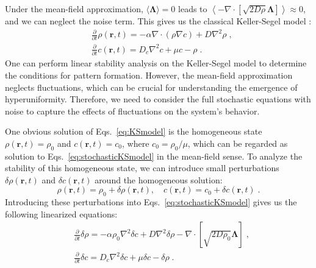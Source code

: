 \documentclass{article}
\begin{document}
Under the mean-field approximation, $\langle \boldsymbol{\Lambda}\rangle=0$ leads to $\left\langle -\nabla\cdot \left[ \sqrt{2D\rho}\boldsymbol{\Lambda} \right] \right\rangle \approx0$, and we can neglect the noise term. This gives us the classical Keller-Segel model \cite{KELLER1971225,KELLER1970399}:
\begin{subequations}
    \begin{align}
        &\frac{\partial}{\partial t} \rho\left( \mathbf{r},t \right) =- \alpha \nabla \cdot \left( \rho \nabla c \right) +D\nabla ^2\rho  \;,\\
        &\frac{\partial}{\partial t} c\left( \mathbf{r},t \right)=D_c\nabla ^2c +\mu c -\rho \;.
    \end{align}
    \label{eq:KSmodel}
\end{subequations}
One can perform linear stability analysis on the Keller-Segel model to determine the conditions for pattern formation. However, the mean-field approximation neglects fluctuations, which can be crucial for understanding the emergence of hyperuniformity. Therefore, we need to consider the full stochastic equations with noise to capture the effects of fluctuations on the system's behavior.

One obvious solution of Eqs.~\eqref{eq:KSmodel} is the homogeneous state $\rho(\mathbf r,t) = \rho_0$ and $c(\mathbf r,t) = c_0$, where $c_0 = \rho_0 / \mu$, which can be regarded as solution to Eqs.~\eqref{eq:stochasticKSmodel} in the mean-field sense. 
To analyze the stability of this homogeneous state, we can introduce small perturbations $\delta \rho(\mathbf r,t)$ and $\delta c(\mathbf r,t)$ around the homogeneous solution:
\begin{equation}
    \rho(\mathbf r,t) = \rho_0 + \delta \rho(\mathbf r,t), \quad c(\mathbf r,t) = c_0 + \delta c(\mathbf r,t)\;.
\end{equation}
Introducing these perturbations into Eqs.~\eqref{eq:stochasticKSmodel} gives us the following linearized equations:
\begin{subequations}
    \begin{align}
        &\frac{\partial}{\partial t}\delta \rho =-\alpha \rho _0\nabla ^2\delta c+D\nabla ^2\delta \rho -\nabla \cdot \left[ \sqrt{2D\rho _0}\boldsymbol{\Lambda } \right] \;,\\
        &\frac{\partial}{\partial t}\delta c=D_c\nabla ^2\delta c+\mu \delta c-\delta \rho \;.
    \end{align}
    \label{eq:linearizedKSmodel}
\end{subequations}
\end{document}
